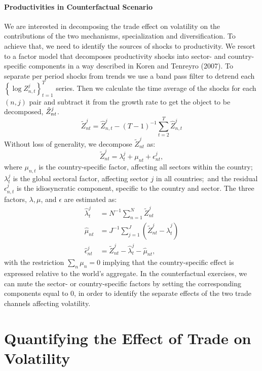 \documentclass[12pt]{article}
\begin{document}
\paragraph{Productivities in Counterfactual Scenario}

We are interested in decomposing the trade effect on volatility on the
contributions of the two mechanisms, specialization and diversification. To
achieve that, we need to identify the sources of shocks to productivity. We
resort to a factor model that decomposes productivity shocks into sector-
and country-specific components in a way described in Koren and Tenreyro
(2007). To separate per period shocks from trends we use a band pass filter
to detrend each $\left\{ \log {Z_{n,t}^{j}}\right\} _{t=1}^{T}$ series. Then
we calculate the time average of the shocks for each $(n,j)$ pair and
subtract it from the growth rate to get the object to be decomposed, $\tilde{%
Z}_{nt}^{j}$. 
\begin{equation*}
\tilde{Z}_{nt}^{j}=\hat{Z}_{n,t}^{j}-(T-1)^{-1}\sum_{t=2}^{T}\hat{Z}%
_{n,t}^{j}
\end{equation*}%
Without loss of generality, we decompose $\tilde{Z}_{nt}^{j}$ as: 
\begin{equation*}
\tilde{Z}_{nt}^{j}=\lambda _{t}^{j}+\mu _{nt}+\epsilon _{nt}^{j},
\end{equation*}
where ${\mu _{n,t}}$ is the country-specific factor, affecting all sectors
within the country; $\lambda _{t}^{j}$ is the global sectoral factor,
affecting sector $j$ in all countries;\ and the residual $\epsilon
_{n,t}^{j} $ is the idiosyncratic component, specific to the country and
sector. The three factors, $\lambda ,\mu $, and $\epsilon $ are estimated
as: 
\begin{align*}
\hat{\lambda}_{t}^{j}& =N^{-1}\sum_{n=1}^{N}\tilde{Z}_{nt}^{j} \\
\hat{\mu}_{nt}& =J^{-1}\sum_{j=1}^{J}\left( \tilde{Z}_{nt}^{j}-\hat{\lambda}%
_{t}^{j}\right) \\
\hat{\epsilon}_{nt}^{j}& =\tilde{Z}_{nt}^{j}-\hat{\lambda}_{t}^{j}-\hat{\mu}%
_{nt}\text{,}
\end{align*}%
with the restriction $\sum_{n}{\mu _{n}}=0$ implying that the
country-specific effect is expressed relative to the world's aggregate. In
the counterfactual exercises, we can mute the sector- or country-specific
factors by setting the corresponding components equal to 0, in order to
identify the separate effects of the two trade channels affecting volatility.

\section{Quantifying the Effect of Trade on Volatility}
\end{document}
